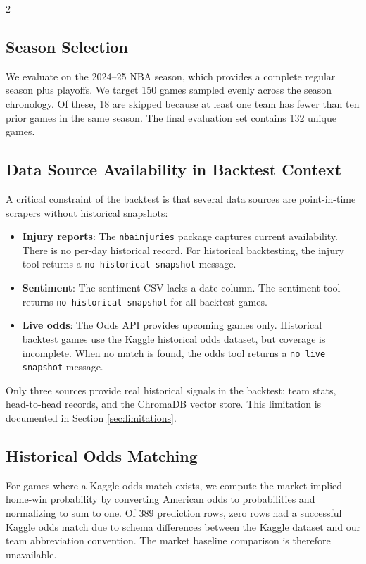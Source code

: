 \documentclass[11pt]{article}
\begin{document}
\begin{multicols}{2}
\subsection{Season Selection}

We evaluate on the 2024--25 NBA season, which provides a complete regular season plus playoffs. We target 150 games sampled evenly across the season chronology. Of these, 18 are skipped because at least one team has fewer than ten prior games in the same season. The final evaluation set contains 132 unique games.

\subsection{Data Source Availability in Backtest Context}

A critical constraint of the backtest is that several data sources are point-in-time scrapers without historical snapshots:

\begin{itemize}[leftmargin=*]
    \item \textbf{Injury reports}: The \texttt{nbainjuries} package captures current availability. There is no per-day historical record. For historical backtesting, the injury tool returns a \texttt{no historical snapshot} message.
    \item \textbf{Sentiment}: The sentiment CSV lacks a date column. The sentiment tool returns \texttt{no historical snapshot} for all backtest games.
    \item \textbf{Live odds}: The Odds API provides upcoming games only. Historical backtest games use the Kaggle historical odds dataset, but coverage is incomplete. When no match is found, the odds tool returns a \texttt{no live snapshot} message.
\end{itemize}

Only three sources provide real historical signals in the backtest: team stats, head-to-head records, and the ChromaDB vector store. This limitation is documented in Section \ref{sec:limitations}.

\subsection{Historical Odds Matching}

For games where a Kaggle odds match exists, we compute the market implied home-win probability by converting American odds to probabilities and normalizing to sum to one. Of 389 prediction rows, zero rows had a successful Kaggle odds match due to schema differences between the Kaggle dataset and our team abbreviation convention. The market baseline comparison is therefore unavailable.


\end{multicols}
\end{document}
